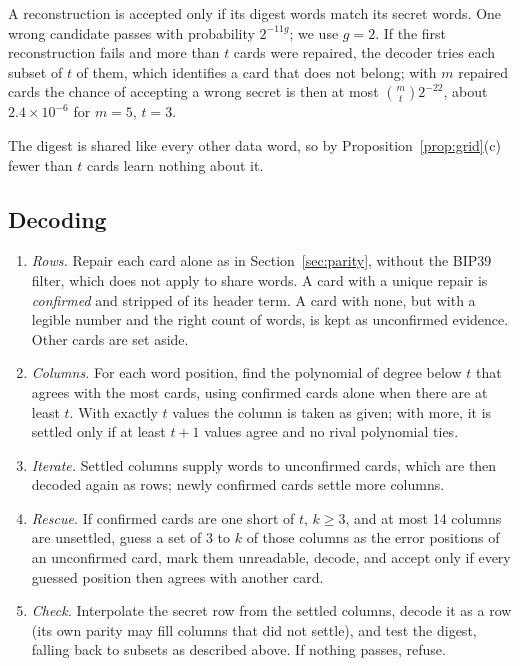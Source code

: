 \documentclass[numeric]{anvil-paper}
\begin{document}
A reconstruction is accepted only if its digest words match its secret words.
One wrong candidate passes with probability $2^{-11g}$; we use $g=2$. If the
first reconstruction fails and more than $t$ cards were repaired, the decoder
tries each subset of $t$ of them, which identifies a card that does not
belong; with $m$ repaired cards the chance of accepting a wrong secret is then
at most $\binom{m}{t}2^{-22}$, about $2.4\times10^{-6}$ for $m=5$, $t=3$.

The digest is shared like every other data word, so by
Proposition~\ref{prop:grid}(c) fewer than $t$ cards learn nothing about it.

\subsection{Decoding}
\label{sec:decoder}

\begin{enumerate}
\item \emph{Rows.} Repair each card alone as in Section~\ref{sec:parity},
  without the BIP39 filter, which does not apply to share words. A card with a
  unique repair is \emph{confirmed} and stripped of its header term. A card
  with none, but with a legible number and the right count of words, is kept
  as unconfirmed evidence. Other cards are set aside.
\item \emph{Columns.} For each word position, find the polynomial of degree
  below $t$ that agrees with the most cards, using confirmed cards alone when
  there are at least $t$. With exactly $t$ values the column is taken as given;
  with more, it is settled only if at least $t+1$ values agree and no rival
  polynomial ties.
\item \emph{Iterate.} Settled columns supply words to unconfirmed cards, which
  are then decoded again as rows; newly confirmed cards settle more columns.
\item \emph{Rescue.} If confirmed cards are one short of $t$, $k\ge 3$, and at
  most 14 columns are unsettled, guess a set of 3 to $k$ of those columns as
  the error positions of an unconfirmed card, mark them unreadable, decode, and
  accept only if every guessed position then agrees with another card.
\item \emph{Check.} Interpolate the secret row from the settled columns, decode
  it as a row (its own parity may fill columns that did not settle), and test
  the digest, falling back to subsets as described above. If nothing passes,
  refuse.
\end{enumerate}
\end{document}

